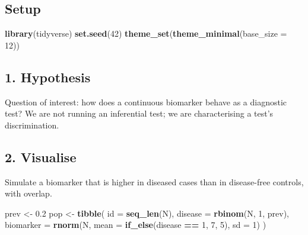 \documentclass[
]{article}
\newenvironment{Shaded}{\begin{snugshade}}{\end{snugshade}}
\newcommand{\AttributeTok}[1]{\textcolor[rgb]{0.13,0.29,0.53}{#1}}
\newcommand{\DecValTok}[1]{\textcolor[rgb]{0.00,0.00,0.81}{#1}}
\newcommand{\FloatTok}[1]{\textcolor[rgb]{0.00,0.00,0.81}{#1}}
\newcommand{\FunctionTok}[1]{\textcolor[rgb]{0.13,0.29,0.53}{\textbf{#1}}}
\newcommand{\NormalTok}[1]{#1}
\newcommand{\OtherTok}[1]{\textcolor[rgb]{0.56,0.35,0.01}{#1}}
\newcommand{\SpecialCharTok}[1]{\textcolor[rgb]{0.81,0.36,0.00}{\textbf{#1}}}
\begin{document}
\subsection{Setup}\label{setup}

\begin{Shaded}
\begin{Highlighting}[]
\FunctionTok{library}\NormalTok{(tidyverse)}
\FunctionTok{set.seed}\NormalTok{(}\DecValTok{42}\NormalTok{)}
\FunctionTok{theme\_set}\NormalTok{(}\FunctionTok{theme\_minimal}\NormalTok{(}\AttributeTok{base\_size =} \DecValTok{12}\NormalTok{))}
\end{Highlighting}
\end{Shaded}

\subsection{1. Hypothesis}\label{hypothesis}

Question of interest: how does a continuous biomarker behave as a
diagnostic test? We are not running an inferential test; we are
characterising a test's discrimination.

\subsection{2. Visualise}\label{visualise}

Simulate a biomarker that is higher in diseased cases than in
disease-free controls, with overlap.

\begin{Shaded}
\begin{Highlighting}[]
\NormalTok{prev }\OtherTok{\textless{}{-}} \FloatTok{0.2}
\NormalTok{pop }\OtherTok{\textless{}{-}} \FunctionTok{tibble}\NormalTok{(}
  \AttributeTok{id =} \FunctionTok{seq\_len}\NormalTok{(N),}
  \AttributeTok{disease =} \FunctionTok{rbinom}\NormalTok{(N, }\DecValTok{1}\NormalTok{, prev),}
  \AttributeTok{biomarker =} \FunctionTok{rnorm}\NormalTok{(N, }\AttributeTok{mean =} \FunctionTok{if\_else}\NormalTok{(disease }\SpecialCharTok{==} \DecValTok{1}\NormalTok{, }\DecValTok{7}\NormalTok{, }\DecValTok{5}\NormalTok{), }\AttributeTok{sd =} \DecValTok{1}\NormalTok{)}
\NormalTok{)}
\end{Highlighting}
\end{Shaded}
\end{document}
